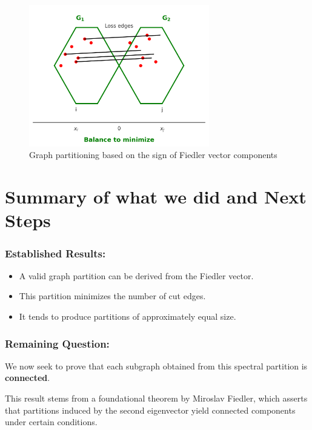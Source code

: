 \documentclass[hidelinks,12pt]{article}
\begin{document}
\begin{figure}[h!]
    \centering
    \includegraphics[width=0.7\textwidth]{figures/partition_graph.png}
    \caption{Graph partitioning based on the sign of Fiedler vector components}
    \label{fig:partition_graph}
\end{figure}

\section{Summary of what we did and Next Steps}

\subsubsection*{Established Results:}
\begin{itemize}
    \item A valid graph partition can be derived from the Fiedler vector.
    \item This partition minimizes the number of cut edges.
    \item It tends to produce partitions of approximately equal size.
\end{itemize}

\subsubsection*{Remaining Question:}
We now seek to prove that each subgraph obtained from this spectral partition is \textbf{connected}.

\medskip

\noindent This result stems from a foundational theorem by Miroslav Fiedler, which asserts that partitions induced by the second eigenvector yield connected components under certain conditions.
\end{document}
